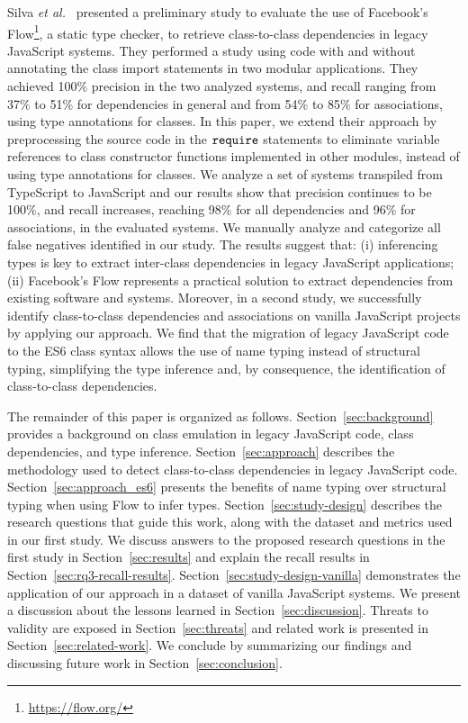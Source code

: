 \documentclass[review]{elsarticle}
\newcommand{\mcode}[1]{$\tt #1$}
\begin{document}
Silva \emph{et al.}~\cite{sanerera2017} presented a preliminary study to evaluate the use of Facebook's Flow\footnote{\url{https://flow.org/}}, a static type checker, to retrieve class-to-class dependencies in legacy JavaScript systems. They performed a study using code with and without annotating the class import statements in two modular applications. They achieved 100\% precision in the two analyzed systems, and recall ranging from 37\% to 51\% for dependencies in general and from 54\% to 85\% for associations, using type annotations for classes. In this paper, we extend their approach by preprocessing the source code in the \mcode{require} statements to eliminate variable references to class constructor functions implemented in other modules, instead of using type annotations for classes. We analyze a set of systems transpiled from TypeScript to JavaScript and our results show that precision continues to be 100\%, and recall increases, reaching 98\% for all dependencies and 96\% for associations, in the evaluated systems. We manually analyze and categorize all false negatives identified in our study. The results suggest that: (i) inferencing types is key to extract inter-class dependencies in legacy JavaScript applications; (ii) Facebook's Flow represents a practical solution to extract dependencies from existing software and systems. Moreover, in a second study, we successfully identify class-to-class dependencies and associations on vanilla JavaScript projects by applying our approach. We find that the migration of legacy JavaScript code to the ES6 class syntax allows the use of name typing instead of structural typing, simplifying the type inference and, by consequence, the identification of class-to-class dependencies. 


The remainder of this paper is organized as follows. Section~\ref{sec:background} provides a background on class emulation in legacy JavaScript code, class dependencies, and type inference. Section~\ref{sec:approach} describes the methodology used to detect class-to-class dependencies in legacy JavaScript code. Section~\ref{sec:approach_es6} presents the benefits of name typing over structural typing when using Flow to infer types. Section~\ref{sec:study-design} describes the research questions that guide this work, along with the dataset and metrics used in our first study. We discuss answers to the proposed research questions in the first study in Section~\ref{sec:results} and explain the recall results in Section~\ref{sec:rq3-recall-results}. Section~\ref{sec:study-design-vanilla} demonstrates the application of our approach in a dataset of vanilla JavaScript systems. We present a discussion about the lessons learned in Section~\ref{sec:discussion}. Threats to validity are exposed in Section~\ref{sec:threats} and related work is presented in Section~\ref{sec:related-work}. We conclude by summarizing our findings and discussing future work in Section~\ref{sec:conclusion}.
\end{document}
